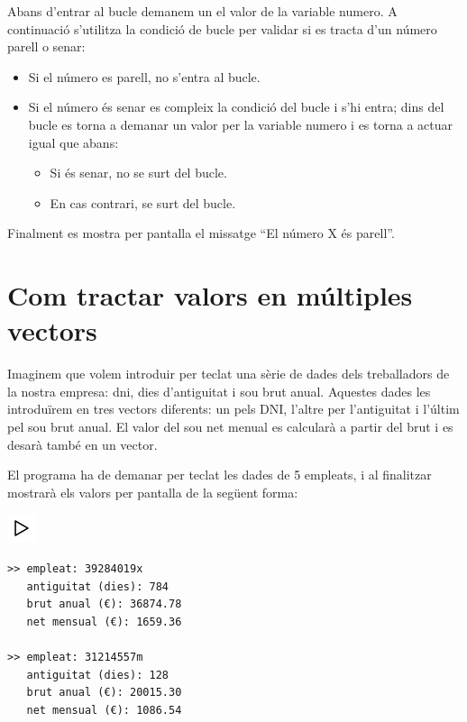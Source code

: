 \documentclass[]{book}
\providecommand{\tightlist}{%
  \setlength{\itemsep}{0pt}\setlength{\parskip}{0pt}}
\begin{document}
Abans d'entrar al bucle demanem un el valor de la variable numero. A continuació s'utilitza la condició de bucle per validar si es tracta d'un número parell o senar:

\begin{itemize}
\tightlist
\item
  Si el número es parell, no s'entra al bucle.
\item
  Si el número és senar es compleix la condició del bucle i s'hi entra; dins del bucle es torna a demanar un valor per la variable numero i es torna a actuar igual que abans:

  \begin{itemize}
  \tightlist
  \item
    Si és senar, no se surt del bucle.
  \item
    En cas contrari, se surt del bucle.
  \end{itemize}
\end{itemize}

Finalment es mostra per pantalla el missatge ``El número X és parell''.

\hypertarget{com-tractar-valors-en-multiples-vectors}{%
\section{Com tractar valors en múltiples vectors}\label{com-tractar-valors-en-multiples-vectors}}

Imaginem que volem introduir per teclat una sèrie de dades dels treballadors de la nostra empresa: dni, dies d'antiguitat i sou brut anual. Aquestes dades les introduïrem en tres vectors diferents: un pels DNI, l'altre per l'antiguitat i l'últim pel sou brut anual. El valor del sou net menual es calcularà a partir del brut i es desarà també en un vector.

El programa ha de demanar per teclat les dades de 5 empleats, i al finalitzar mostrarà els valors per pantalla de la següent forma:

\includegraphics{./img/play.png}

\begin{verbatim}
>> empleat: 39284019x
   antiguitat (dies): 784
   brut anual (€): 36874.78
   net mensual (€): 1659.36

>> empleat: 31214557m
   antiguitat (dies): 128
   brut anual (€): 20015.30
   net mensual (€): 1086.54
\end{verbatim}
\end{document}
